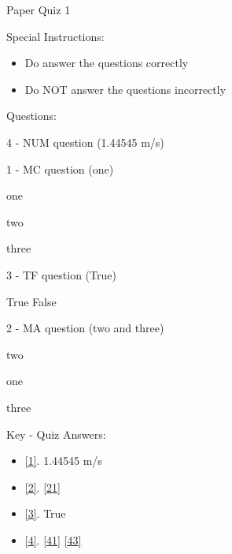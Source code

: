 \documentclass[letterpaper,10pt]{article}
\begin{document}
\begin{center}
{\Large Paper Quiz 1}
\end{center}

Special Instructions:
\begin{itemize}
    \item Do answer the questions correctly
    \item Do NOT answer the questions incorrectly
\end{itemize}
\vspace{10pt}
Questions:
\vspace{10pt}

\begin{compactenum} 
\begin{minipage}{\linewidth}
    \item \label{1} 4 - NUM question (1.44545 m/s)
    
    \end{minipage}

    \vspace{10pt}

\begin{minipage}{\linewidth}
    \item \label{2} 1 - MC question (one)
    \begin{compactenum} 
        \item \label{21} one
        \item \label{22} two
        \item \label{23} three
    \end{compactenum}
    
    \end{minipage}

    \vspace{10pt}

\begin{minipage}{\linewidth}
    \item \label{3} 3 - TF question (True)

        True \hskip 1cm False
    
    \end{minipage}

    \vspace{10pt}

\begin{minipage}{\linewidth}
    \item \label{4} 2 - MA question (two and three)
    \begin{compactenum} 
        \item \label{41} two
        \item \label{42} one
        \item \label{43} three
    \end{compactenum}
    
    \end{minipage}

    \vspace{10pt}

\end{compactenum}

\clearpage
Key - Quiz Answers:
\begin{itemize}
      \item \ref{1}.
            1.44545 m/s 
      \item \ref{2}.
            \ref{21} 
      \item \ref{3}.
            True 
      \item \ref{4}.
            \ref{41} 
            \ref{43} 

\end{itemize}
\end{document}
